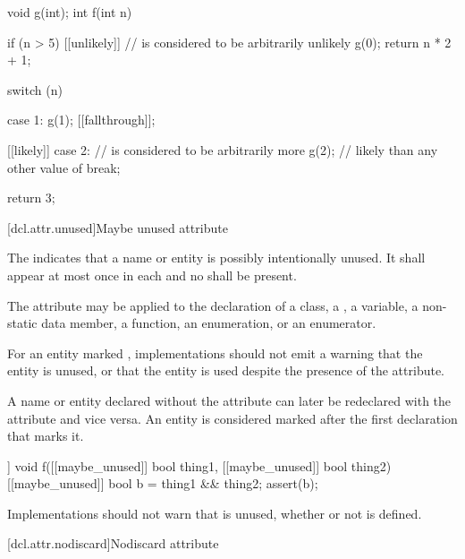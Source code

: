 \pnum
\begin{example}
\begin{codeblock}
void g(int);
int f(int n) {
  if (n > 5) [[unlikely]] {     //  is considered to be arbitrarily unlikely
    g(0);
    return n * 2 + 1;
  }

  switch (n) {
  case 1:
    g(1);
    [[fallthrough]];

  [[likely]] case 2:            //  is considered to be arbitrarily more
    g(2);                       // likely than any other value of 
    break;
  }
  return 3;
}
\end{codeblock}
\end{example}

[dcl.attr.unused]{Maybe unused attribute}%

\pnum
The  
indicates that a name or entity is possibly intentionally unused.
It shall appear at most once in each  and
no  shall be present.

\pnum
The attribute may be applied to the declaration of a class,
a , a variable, a non-static data member,
a function, an enumeration, or an enumerator.

\pnum
\begin{note}
For an entity marked , implementations
should not emit a warning that the entity is unused, or
that the entity is used despite the presence of the attribute.
\end{note}

\pnum
A name or entity declared without the  attribute
can later be redeclared with the attribute
and vice versa.
An entity is considered marked
after the first declaration that marks it.

\pnum
\begin{example}
\begin{codeblock}
[[maybe_unused]] void f([[maybe_unused]] bool thing1,
                        [[maybe_unused]] bool thing2) {
  [[maybe_unused]] bool b = thing1 && thing2;
  assert(b);
}
\end{codeblock}
Implementations should not warn that  is unused,
whether or not  is defined.
\end{example}

[dcl.attr.nodiscard]{Nodiscard attribute}%

